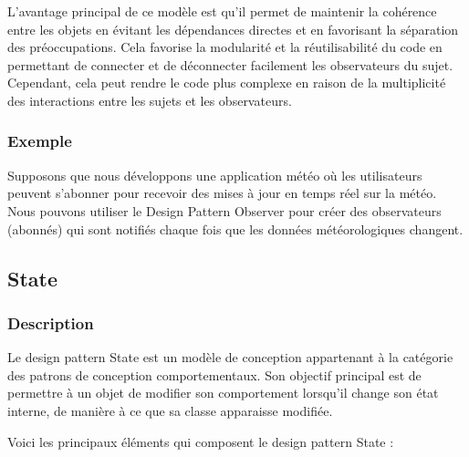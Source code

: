 L'avantage principal de ce modèle est qu'il permet de maintenir la cohérence entre les objets en évitant les dépendances directes et en favorisant la séparation des préoccupations. Cela favorise la modularité et la réutilisabilité du code en permettant de connecter et de déconnecter facilement les observateurs du sujet. Cependant, cela peut rendre le code plus complexe en raison de la multiplicité des interactions entre les sujets et les observateurs.


\subsubsection{Exemple}

Supposons que nous développons une application météo où les utilisateurs peuvent s'abonner pour recevoir des mises à jour en temps réel sur la météo. Nous pouvons utiliser le Design Pattern Observer pour créer des observateurs (abonnés) qui sont notifiés chaque fois que les données météorologiques changent.




\newpage

\subsection{State}

\subsubsection{Description}

Le design pattern State est un modèle de conception appartenant à la catégorie des patrons de conception comportementaux. Son objectif principal est de permettre à un objet de modifier son comportement lorsqu'il change son état interne, de manière à ce que sa classe apparaisse modifiée.

Voici les principaux éléments qui composent le design pattern State :

